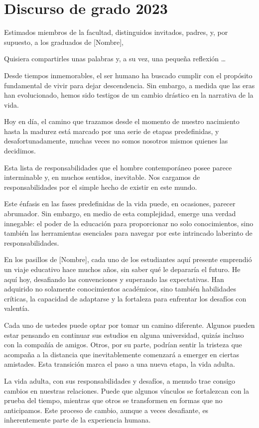 \documentclass[letterpaper, 12pt]{article}
\begin{document}
\section*{Discurso de grado 2023}

Estimados miembros de la facultad, distinguidos invitados,
padres, y, por supuesto, a los graduados de [Nombre],

Quisiera compartirles unas palabras y, a su vez, una
pequeña reflexión \dots

Desde tiempos inmemorables, el ser humano ha buscado
cumplir con el propósito fundamental de vivir para dejar
descendencia. Sin embargo, a medida que las eras han
evolucionado, hemos sido testigos de un cambio drástico en
la narrativa de la vida.

Hoy en día, el camino que trazamos desde el momento de
nuestro nacimiento hasta la madurez está marcado por una
serie de etapas predefinidas, y desafortunadamente, muchas
veces no somos nosotros mismos quienes las decidimos.

Esta lista de responsabilidades que el hombre contemporáneo
posee parece interminable y, en muchos sentidos,
inevitable. Nos cargamos de responsabilidades por el simple
hecho de existir en este mundo.

Este énfasis en las fases predefinidas de la vida puede, en
ocasiones, parecer abrumador. Sin embargo, en medio de esta
complejidad, emerge una verdad innegable: el poder de la
educación para proporcionar no solo conocimientos, sino
también las herramientas esenciales para navegar por este
intrincado laberinto de responsabilidades.

En los pasillos de [Nombre], cada uno de los estudiantes
aquí presente emprendió un viaje educativo hace muchos
años, sin saber qué le depararía el futuro. He aquí hoy,
desafiando las convenciones y superando las expectativas.
Han adquirido no solamente conocimientos académicos, sino
también habilidades críticas, la capacidad de adaptarse y
la fortaleza para enfrentar los desafíos con valentía.

Cada uno de ustedes puede optar por tomar un camino
diferente. Algunos pueden estar pensando en continuar sus
estudios en alguna universidad, quizás incluso con la
compañía de amigos. Otros, por su parte, podrían sentir la
tristeza que acompaña a la distancia que inevitablemente
comenzará a emerger en ciertas amistades. Esta transición
marca el paso a una nueva etapa, la vida adulta.

La vida adulta, con sus responsabilidades y desafíos, a
menudo trae consigo cambios en nuestras relaciones. Puede
que algunos vínculos se fortalezcan con la prueba del
tiempo, mientras que otros se transformen en formas que no
anticipamos. Este proceso de cambio, aunque a veces
desafiante, es inherentemente parte de la experiencia
humana.
\end{document}
